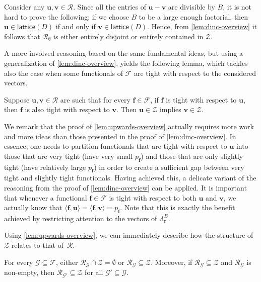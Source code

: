 \documentclass{theoretics}
\newcommand{\tup}[1]{{\mathbf{#1}}}
\newcommand{\ff}{\tup f}
\newcommand{\rr}{\tup r}
\newcommand{\uu}{\tup u}
\newcommand{\myvv}{\tup v} %
\newcommand{\Ff}{\mathcal{F}}
\newcommand{\Gg}{\mathcal{G}}
\newcommand{\Rr}{\mathcal{R}}
\newcommand{\Zz}{\mathcal{Z}}
\newcommand{\sca}[2]{\langle #1,#2\rangle}
\newcommand{\lattice}{\mathsf{lattice}}
\begin{document}
Consider any $\uu,\myvv\in \Rr$. Since all the entries of $\uu-\myvv$ are divisible by $B$, it is not hard to prove the following: if we choose $B$ to be a large enough factorial, then $\uu\in \lattice(D)$ if and only if $\myvv\in \lattice(D)$. Hence, from \cref{lem:dinc-overview} it follows that $\Rr_\emptyset$ is either entirely disjoint or entirely contained in $\Zz$.

A more involved reasoning based on the same fundamental ideas, but using a generalization of \cref{lem:dinc-overview}, yields the following lemma, which tackles also the case when some functionals of $\Ff$ are tight with respect to the considered vectors.

\begin{lemma}\label{lem:upwards-overview}
Suppose $\uu,\myvv\in \Rr$ are such that for every $\ff\in \Ff$, if $\ff$ is tight with respect to $\uu$, then $\ff$ is also tight with respect to $\myvv$. Then $\uu\in \Zz$ implies $\myvv\in \Zz$.
\end{lemma}

We remark that the proof of \cref{lem:upwards-overview} actually requires more work and more ideas than those presented in the proof of \cref{lem:dinc-overview}. In essence, one needs to partition functionals that are tight with respect to $\uu$ into those that are very tight (have very small $p_\ff$) and those that are only slightly tight (have relatively large $p_\ff$) in order to create a sufficient gap between very tight and slightly tight functionals. Having achieved this, a delicate variant of the reasoning from the proof of \cref{lem:dinc-overview} can be applied. It is important that whenever a functional $\ff\in \Ff$ is tight with respect to both $\uu$ and $\myvv$, we actually know that $\sca{\ff}{\uu}=\sca{\ff}{\myvv}=p_\ff$. Note that this is exactly the benefit achieved by restricting attention to the vectors of $\Lambda_\rr^B$.

Using \cref{lem:upwards-overview}, we can immediately describe how the structure of $\Zz$ relates to that of~$\Rr$.

\begin{corollary}\label{cor:structure}
For every $\Gg\subseteq \Ff$, either $\Rr_\Gg\cap \Zz=\emptyset$ or $\Rr_\Gg\subseteq \Zz$. Moreover, if $\Rr_\Gg\subseteq \Zz$ and $\Rr_{\Gg}$ is non-empty, then $\Rr_{\Gg'}\subseteq \Zz$ for all $\Gg'\subseteq \Gg$.
\end{corollary}
\end{document}

